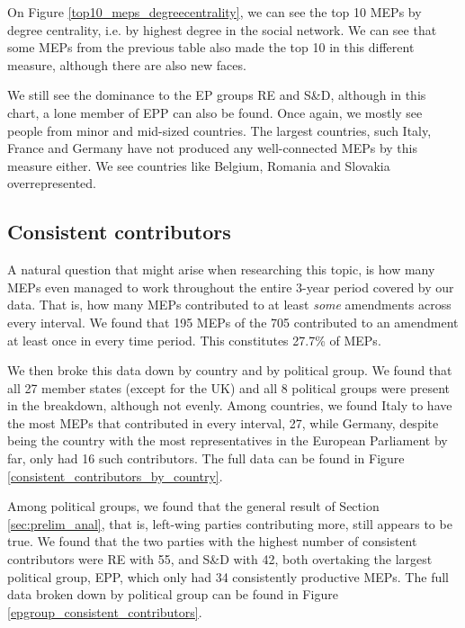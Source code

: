 \documentclass[lettersize,journal]{IEEEtran}
\begin{document}
On Figure \ref{top10_meps_degreecentrality}, we can see the top 10 MEPs by degree centrality, i.e. by highest degree in the social network. We can see that some MEPs from the previous table also made the top 10 in this different measure, although there are also new faces.

We still see the dominance to the EP groups RE and S\&D, although in this chart, a lone member of EPP can also be found. Once again, we mostly see people from minor and mid-sized countries. The largest countries, such Italy, France and Germany have not produced any well-connected MEPs by this measure either. We see countries like Belgium, Romania and Slovakia overrepresented.


\subsection{Consistent contributors}

A natural question that might arise when researching this topic, is how many MEPs even managed to work throughout the entire 3-year period covered by our data. That is, how many MEPs contributed to at least \textit{some} amendments across every interval. We found that 195 MEPs of the 705 contributed to an amendment at least once in every time period. This constitutes 27.7\% of MEPs.

We then broke this data down by country and by political group. We found that all 27 member states (except for the UK) and all 8 political groups were present in the breakdown, although not evenly. Among countries, we found Italy to have the most MEPs that contributed in every interval, 27, while Germany, despite being the country with the most representatives in the European Parliament by far, only had 16 such contributors. The full data can be found in Figure \ref{consistent_contributors_by_country}.

Among political groups, we found that the general result of Section \ref{sec:prelim_anal}, that is, left-wing parties contributing more, still appears to be true. We found that the two parties with the highest number of consistent contributors were RE with 55, and S\&D with 42, both overtaking the largest political group, EPP, which only had 34 consistently productive MEPs. The full data broken down by political group can be found in Figure \ref{epgroup_consistent_contributors}.

\end{document}
